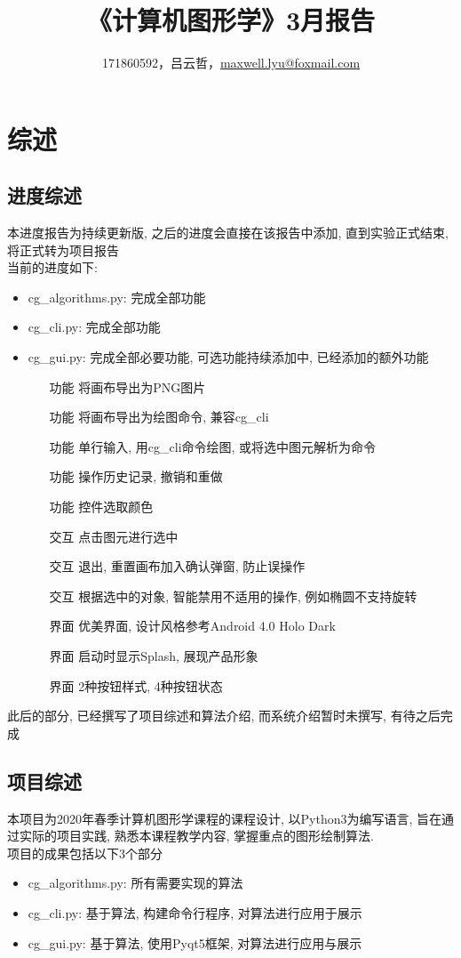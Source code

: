 \documentclass[a4paper,UTF8]{article}
\theoremstyle{definition}
\begin{document}
\title{\textbf{《计算机图形学》3月报告}}
\author{171860592，吕云哲，\href{mailto:maxwell.lyu@foxmail.com}{maxwell.lyu@foxmail.com}}
\maketitle

\section{综述}
\subsection{进度综述}
  本进度报告为持续更新版, 之后的进度会直接在该报告中添加, 直到实验正式结束, 将正式转为项目报告\\
  当前的进度如下: 
  \begin{itemize}
    \item cg\_algorithms.py: 完成全部功能
    \item cg\_cli.py: 完成全部功能
    \item cg\_gui.py: 完成全部必要功能, 可选功能持续添加中, 已经添加的额外功能
    \begin{itemize}
      \item [功能]将画布导出为PNG图片
      \item [功能]将画布导出为绘图命令, 兼容cg\_cli
      \item [功能]单行输入, 用cg\_cli命令绘图, 或将选中图元解析为命令
      \item [功能]操作历史记录, 撤销和重做
      \item [功能]控件选取颜色
      \item [交互]点击图元进行选中
      \item [交互]退出, 重置画布加入确认弹窗, 防止误操作
      \item [交互]根据选中的对象, 智能禁用不适用的操作, 例如椭圆不支持旋转
      \item [界面]优美界面, 设计风格参考Android 4.0 Holo Dark
      \item [界面]启动时显示Splash, 展现产品形象
      \item [界面]2种按钮样式, 4种按钮状态
    \end{itemize}
  \end{itemize}
  此后的部分, 已经撰写了项目综述和算法介绍, 而系统介绍暂时未撰写, 有待之后完成
\subsection{项目综述}
  本项目为2020年春季计算机图形学课程的课程设计, 以Python3为编写语言, 旨在通过实际的项目实践, 熟悉本课程教学内容, 掌握重点的图形绘制算法.\\
  项目的成果包括以下3个部分
  \begin{itemize}
    \item cg\_algorithms.py: 所有需要实现的算法
    \item cg\_cli.py: 基于算法, 构建命令行程序, 对算法进行应用于展示
    \item cg\_gui.py: 基于算法, 使用Pyqt5框架, 对算法进行应用与展示
  \end{itemize}
\end{document}
